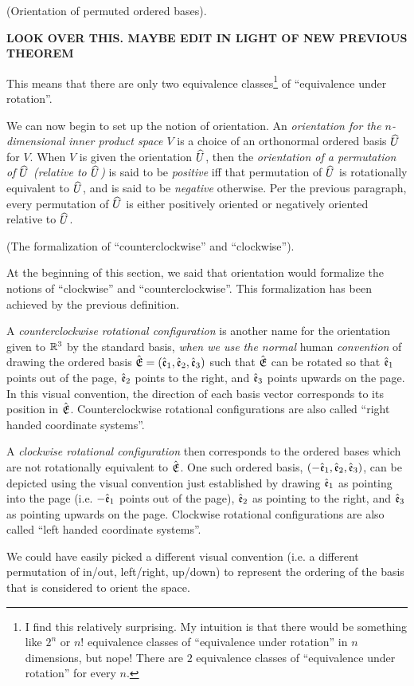 \begin{defn}
    (Orientation of permuted ordered bases).

    \textbf{LOOK OVER THIS. MAYBE EDIT IN LIGHT OF NEW PREVIOUS THEOREM}
    
    This means that there are only two equivalence classes\footnote{I find this relatively surprising. My intuition is that there would be something like $2^n$ or $n!$ equivalence classes of ``equivalence under rotation'' in $n$ dimensions, but nope! There are $2$ equivalence classes of ``equivalence under rotation'' for every $n$.} of ``equivalence under rotation''.
    
    We can now begin to set up the notion of orientation. An \textit{orientation for the $n$-dimensional inner product space $V$} is a choice of an orthonormal ordered basis $\widehat{U}$ for $V$. When $V$ is given the orientation $\widehat{U}$, then the \textit{orientation of a permutation of $\widehat{U}$ (relative to $\widehat{U}$)} is said to be \textit{positive} iff that permutation of $\widehat{U}$ is rotationally equivalent to $\widehat{U}$, and is said to be \textit{negative} otherwise. Per the previous paragraph, every permutation of $\widehat{U}$ is either positively oriented or negatively oriented relative to $\widehat{U}$.
\end{defn}

\begin{remark}
\label{ch::lin_alg::rmk::formalization_ccw_cw}
    (The formalization of ``counterclockwise'' and ``clockwise'').
    
    At the beginning of this section, we said that orientation would formalize the notions of ``clockwise'' and ``counterclockwise''. This formalization has been achieved by the previous definition.
    
    A \textit{counterclockwise rotational configuration} is another name for the orientation given to $\mathbb{R}^3$ by the standard basis, \textit{when we use the normal} human \textit{convention} of drawing the ordered basis ${\hat{\mathfrak{E}}} = (\hat{\mathfrak{e}}_1, \hat{\mathfrak{e}}_2, \hat{\mathfrak{e}}_3)$ such that ${\hat{\mathfrak{E}}}$ can be rotated so that $\hat{\mathfrak{e}}_1$ points out of the page, $\hat{\mathfrak{e}}_2$ points to the right, and $\hat{\mathfrak{e}}_3$ points upwards on the page. In this visual convention, the direction of each basis vector corresponds to its position in ${\hat{\mathfrak{E}}}$. Counterclockwise rotational configurations are also called ``right handed coordinate systems''.
    
    A \textit{clockwise rotational configuration} then corresponds to the ordered bases which are not rotationally equivalent to ${\hat{\mathfrak{E}}}$. One such ordered basis, $(-\hat{\mathfrak{e}}_1, \hat{\mathfrak{e}}_2, \hat{\mathfrak{e}}_3)$, can be depicted using the visual convention just established by drawing $\hat{\mathfrak{e}}_1$ as pointing into the page (i.e. $-\hat{\mathfrak{e}}_1$ points out of the page), $\hat{\mathfrak{e}}_2$ as pointing to the right, and $\hat{\mathfrak{e}}_3$ as pointing upwards on the page. Clockwise rotational configurations are also called ``left handed coordinate systems''.
    
    We could have easily picked a different visual convention (i.e. a different permutation of in/out, left/right, up/down) to represent the ordering of the basis that is considered to orient the space.
\end{remark}

